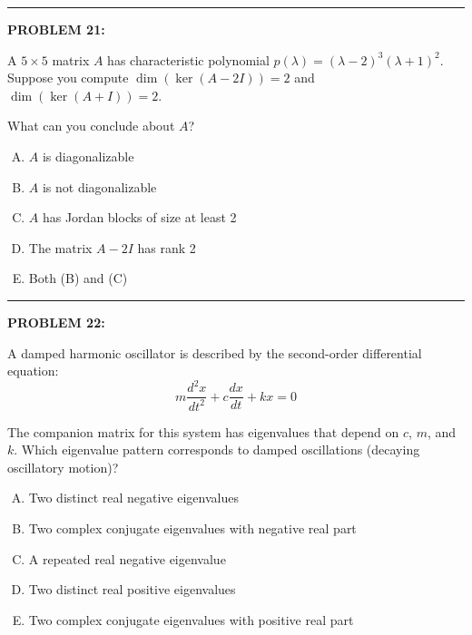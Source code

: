 \documentclass[12pt]{amsart}
\newcommand{\divider}{
  \vspace{-1em} %
  \noindent
  \raisebox{-0.15ex}{\textbullet}%
  \hspace{0.5em}%
  \rule[0.5ex]{0.95\textwidth}{1.0pt}%
  \hspace{0.5em}%
  \raisebox{-0.15ex}{\textbullet}%
  \vspace{0em} %
}
\begin{document}
\divider


{\bf PROBLEM 21:}

A $5 \times 5$ matrix $A$ has characteristic polynomial $p(\lambda) = (\lambda - 2)^3(\lambda + 1)^2$. Suppose you compute $\dim(\ker(A - 2I)) = 2$ and $\dim(\ker(A + I)) = 2$.

What can you conclude about $A$?

\begin{enumerate}[(A)]
\item $A$ is diagonalizable
\item $A$ is not diagonalizable
\item $A$ has Jordan blocks of size at least 2
\item The matrix $A - 2I$ has rank 2
\item Both (B) and (C)
\end{enumerate}


\divider


{\bf PROBLEM 22:}

A damped harmonic oscillator is described by the second-order differential equation:
$$m\frac{d^2x}{dt^2} + c\frac{dx}{dt} + kx = 0$$

The companion matrix for this system has eigenvalues that depend on $c$, $m$, and $k$. Which eigenvalue pattern corresponds to damped oscillations (decaying oscillatory motion)?

\begin{enumerate}[(A)]
\item Two distinct real negative eigenvalues
\item Two complex conjugate eigenvalues with negative real part
\item A repeated real negative eigenvalue
\item Two distinct real positive eigenvalues
\item Two complex conjugate eigenvalues with positive real part
\end{enumerate}
\end{document}
